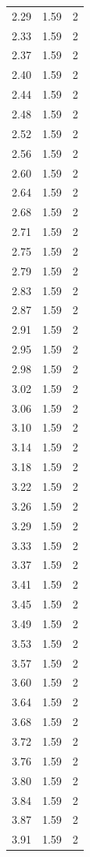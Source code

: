 \begin{longtable}{lrr}
  2.29 & 1.59 & 2 \\
  2.33 & 1.59 & 2 \\
  2.37 & 1.59 & 2 \\
  2.40 & 1.59 & 2 \\
  2.44 & 1.59 & 2 \\
  2.48 & 1.59 & 2 \\
  2.52 & 1.59 & 2 \\
  2.56 & 1.59 & 2 \\
  2.60 & 1.59 & 2 \\
  2.64 & 1.59 & 2 \\
  2.68 & 1.59 & 2 \\
  2.71 & 1.59 & 2 \\
  2.75 & 1.59 & 2 \\
  2.79 & 1.59 & 2 \\
  2.83 & 1.59 & 2 \\
  2.87 & 1.59 & 2 \\
  2.91 & 1.59 & 2 \\
  2.95 & 1.59 & 2 \\
  2.98 & 1.59 & 2 \\
  3.02 & 1.59 & 2 \\
  3.06 & 1.59 & 2 \\
  3.10 & 1.59 & 2 \\
  3.14 & 1.59 & 2 \\
  3.18 & 1.59 & 2 \\
  3.22 & 1.59 & 2 \\
  3.26 & 1.59 & 2 \\
  3.29 & 1.59 & 2 \\
  3.33 & 1.59 & 2 \\
  3.37 & 1.59 & 2 \\
  3.41 & 1.59 & 2 \\
  3.45 & 1.59 & 2 \\
  3.49 & 1.59 & 2 \\
  3.53 & 1.59 & 2 \\
  3.57 & 1.59 & 2 \\
  3.60 & 1.59 & 2 \\
  3.64 & 1.59 & 2 \\
  3.68 & 1.59 & 2 \\
  3.72 & 1.59 & 2 \\
  3.76 & 1.59 & 2 \\
  3.80 & 1.59 & 2 \\
  3.84 & 1.59 & 2 \\
  3.87 & 1.59 & 2 \\
  3.91 & 1.59 & 2 \\

\end{longtable}
